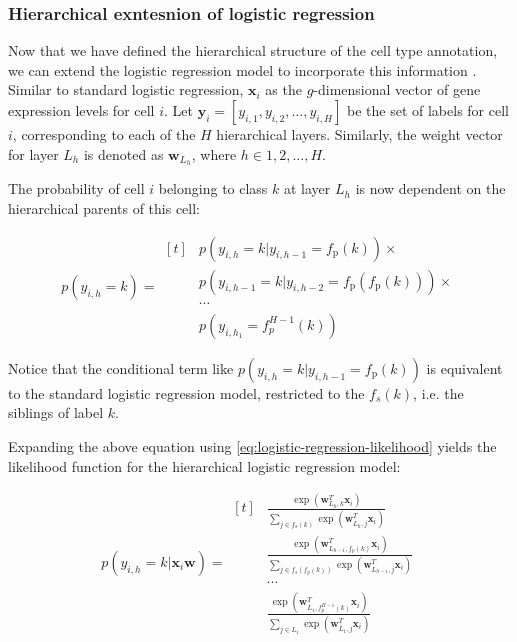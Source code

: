 \subsubsection*{Hierarchical exntesnion of logistic regression}

Now that we have defined the hierarchical structure of the cell type annotation, we can extend the logistic regression model to incorporate this information . Similar to standard logistic regression, $\mathbf{x}_i$ as the $g$-dimensional vector of gene expression levels for cell $i$. Let $\mathbf{y}_i = [y_{i,1}, y_{i,2}, \ldots, y_{i,H}]$ be the set of labels for cell $i$, corresponding to each of the $H$ hierarchical layers. Similarly, the weight vector for layer $L_h$ is denoted as $\mathbf{w}_{L_h}$, where $h \in {1, 2, \ldots, H}$.

The probability of cell $i$ belonging to class $k$ at layer $L_h$ is now dependent on the hierarchical parents of this cell:

\begin{equation}
    p(y_{i,h} = k) = \begin{aligned}[t]
        & p(y_{i,h} = k | y_{i,h-1} = f_{\text{p}}(k)) \times \\
        & p(y_{i,h-1} = k | y_{i,h-2} = f_{\text{p}}(f_{\text{p}}(k))) \times \\
        & \cdots \\
        & p(y_{i,h_1} = f_{p}^{H-1}(k))
    \end{aligned}
\end{equation}

Notice that the conditional term like $p(y_{i,h} = k | y_{i,h-1} = f_{\text{p}}(k))$ is equivalent to the standard logistic regression model, restricted to the $f_s(k)$, i.e. the siblings of label $k$. 

Expanding the above equation using \cref{eq:logistic-regression-likelihood} yields the likelihood function for the hierarchical logistic regression model:

\begin{equation}
    p(y_{i,h} = k | \mathbf{x}_{i} \mathbf{w}) = \begin{aligned}[t]
        & \frac{\exp(\mathbf{w}_{L_h, k}^T \mathbf{x}_i)}{\sum_{j \in f_s(k)} \exp(\mathbf{w}_{L_h, j}^T \mathbf{x}_i)} \\
        & \frac{\exp(\mathbf{w}_{L_{h-1}, f_p(k)}^T \mathbf{x}_i)}{\sum_{j \in  f_s(f_p(k))} \exp(\mathbf{w}_{L_{h-1}, j}^T \mathbf{x}_i)} \\
        & \cdots \\
        & \frac{\exp(\mathbf{w}_{L_1, f_p^{H-1}(k)}^T \mathbf{x}_i)}{\sum_{j \in L_1} \exp(\mathbf{w}_{L_1, j}^T \mathbf{x}_i)}
    \end{aligned}
\end{equation}

